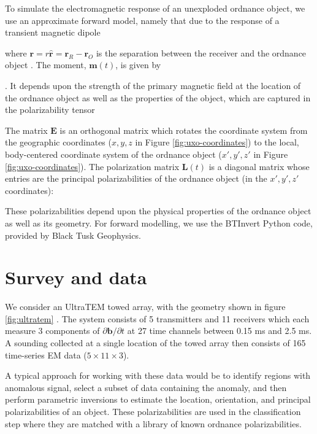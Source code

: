 \documentclass{segabs}
\begin{document}

To simulate the electromagnetic response of an unexploded ordnance object, we use an approximate forward model, namely that due to the response of a transient magnetic dipole

where $\mathbf{r} = r\mathbf{\hat{r}} = \mathbf{r}_R - \mathbf{r}_O$ is the separation between the receiver and the ordnance object \citep{Bell2001, Pasion2001, Zhang2003}. The moment, $\mathbf{m}(t)$, is given by

\cite{Bell2001}. It depends upon the strength of the primary magnetic field at the location of the ordnance object as well as the properties of the object, which are captured in the polarizability tensor

The matrix $\mathbf{E}$ is an orthogonal matrix which rotates the coordinate system from the geographic coordinates ($x, y, z$ in Figure \ref{fig:uxo-coordinates}) to the local, body-centered coordinate system of the ordnance object ($x', y', z'$ in Figure \ref{fig:uxo-coordinates}). The polarization matrix $\mathbf{L}(t)$ is a diagonal matrix whose entries are the principal polarizabilities of the ordnance object (in the $x', y', z'$ coordinates):

These polarizabilities depend upon the physical properties of the ordnance object as well as its geometry. For forward modelling, we use the BTInvert Python code, provided by Black Tusk Geophysics.

\vspace{-0.45cm}
\section{Survey and data}
\vspace{-0.25cm}

We consider an UltraTEM towed array, with the geometry shown in figure \ref{fig:ultratem} \citep{Billings2018}. The system consists of 5 transmitters and 11 receivers which each measure 3 components of $\partial \mathbf{b}/\partial t$ at 27 time channels between 0.15 ms and 2.5 ms. A sounding collected at a single location of the towed array then consists of 165 time-series EM data ($5 \times 11 \times 3$).


A typical approach for working with these data would be to identify regions with anomalous signal, select a subset of data containing the anomaly, and then perform parametric inversions to estimate the location, orientation, and principal polarizabilities of an object. These polarizabilities are used in the classification step where they are matched with a library of known ordnance polarizabilities.
\end{document}
